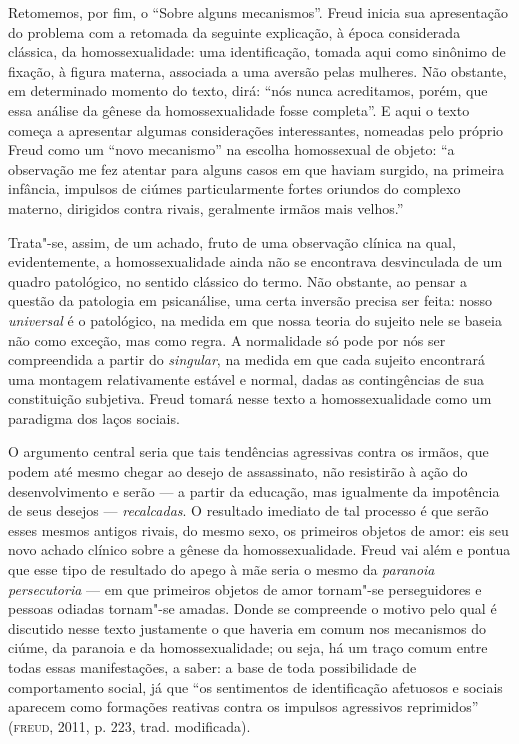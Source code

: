 Retomemos, por fim, o ``Sobre alguns mecanismos''. Freud inicia sua
apresentação do problema com a retomada da seguinte explicação, à época
considerada clássica, da homossexualidade: uma identificação, tomada
aqui como sinônimo de fixação, à figura materna, associada a uma aversão
pelas mulheres. Não obstante, em determinado momento do texto, dirá:
``nós nunca acreditamos, porém, que essa análise da gênese da
homossexualidade fosse completa''. E aqui o texto começa a apresentar
algumas considerações interessantes, nomeadas pelo próprio Freud como um
``novo mecanismo'' na escolha homossexual de objeto: ``a observação me
fez atentar para alguns casos em que haviam surgido, na primeira
infância, impulsos de ciúmes particularmente fortes oriundos do complexo
materno, dirigidos contra rivais, geralmente irmãos mais velhos.''

Trata"-se, assim, de um achado, fruto de uma observação clínica na qual,
evidentemente, a homossexualidade ainda não se encontrava desvinculada
de um quadro patológico, no sentido clássico do termo. Não obstante, ao
pensar a questão da patologia em psicanálise, uma certa inversão precisa
ser feita: nosso \emph{universal} é o patológico, na medida em que nossa
teoria do sujeito nele se baseia não como exceção, mas como regra. A
normalidade só pode por nós ser compreendida a partir do
\emph{singular}, na medida em que cada sujeito encontrará uma montagem
relativamente estável e normal, dadas as contingências de sua
constituição subjetiva. Freud tomará nesse texto a homossexualidade como
um paradigma dos laços sociais.

O argumento central seria que tais tendências agressivas contra os
irmãos, que podem até mesmo chegar ao desejo de assassinato, não
resistirão à ação do desenvolvimento e serão --- a partir da educação,
mas igualmente da impotência de seus desejos --- \emph{recalcadas}. O
resultado imediato de tal processo é que serão esses mesmos antigos
rivais, do mesmo sexo, os primeiros objetos de amor: eis seu novo achado
clínico sobre a gênese da homossexualidade. Freud vai além e pontua que
esse tipo de resultado do apego à mãe seria o mesmo da \emph{paranoia
persecutoria} --- em que primeiros objetos de amor tornam"-se
perseguidores e pessoas odiadas tornam"-se amadas. Donde se compreende o
motivo pelo qual é discutido nesse texto justamente o que haveria em
comum nos mecanismos do ciúme, da paranoia e da homossexualidade; ou
seja, há um traço comum entre todas essas manifestações, a saber: a base
de toda possibilidade de comportamento social, já que ``os sentimentos
de identificação afetuosos e sociais aparecem como formações reativas
contra os impulsos agressivos reprimidos'' (\textsc{freud}, 2011, p. 223, trad. modificada).

